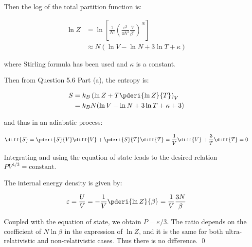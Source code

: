 \documentclass[12pt]{article}
\begin{document}
Then the log of the total partition function is:

\begin{equation}
\begin{split}
\ln{Z} &= \ln{\left[ \frac{1}{N!} \left( \frac{c^3}{\pi \hbar^{3}} \frac{V}{\beta^3} \right)^{N} \right]} \\
       &\approx N (\ln{V} - \ln{N} + 3\ln{T} + \kappa)
\end{split}
\end{equation}

where Stirling formula has been used and $\kappa$ is a constant.

Then from Question 5.6 Part (a), the entropy is:

\begin{equation}
\begin{split}
S &= k_{B} \left( \ln{Z} + T \pderi{\ln{Z}}{T} \right)_{V} \\
  &= k_{B} N (\ln{V} - \ln{N} + 3\ln{T} + \kappa + 3)
\end{split}
\end{equation}

and thus in an adiabatic process:

\begin{equation}
\diff{S} = \pderi{S}{V} \diff{V} + \pderi{S}{T} \diff{T} = \frac{1}{V} \diff{V} + \frac{3}{T} \diff{T} = 0
\end{equation}

Integrating and using the equation of state leads to the desired relation $PV^{4/3} = \text{constant}$.

The internal energy density is given by:

\begin{equation}
\varepsilon = \frac{U}{V} = - \frac{1}{V} \pderi{\ln{Z}}{\beta} = \frac{1}{V} \frac{3N}{\beta}
\end{equation}

Coupled with the equation of state, we obtain $P = \varepsilon/3$. The ratio depends on the coefficient of $N\ln{\beta}$ in the expression of $\ln{Z}$, and it is the same for both ultra-relativistic and non-relativistic cases. Thus there is no difference.
\qed
\end{document}
